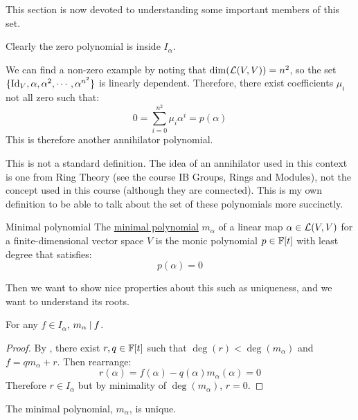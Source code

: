 \documentclass[../Main.tex]{subfiles}
\begin{document}
This section is now devoted to understanding some important members of this set.
\begin{example}
    Clearly the zero polynomial is inside $I_\alpha$.

    We can find a non-zero example by noting that $\dim(\mathcal{L}(V, V)) = n^2$, so the set $\{\operatorname{Id}_V, \alpha, \alpha^2, \cdots, \alpha^{n^2}\}$ is linearly dependent. Therefore, there exist coefficients $\mu_i$ not all zero such that:
    \begin{equation*}
        0 = \sum_{i=0}^{n^2} \mu_i \alpha^i = p(\alpha)
    \end{equation*}
    This is therefore another annihilator polynomial.
\end{example}
\begin{warning}
    This is not a standard definition. The idea of an annihilator used in this context is one from Ring Theory (see the course IB Groups, Rings and Modules), not the concept used in this course (although they are connected). This is my own definition to be able to talk about the set of these polynomials more succinctly.
\end{warning}
\begin{definition}{Minimal polynomial}
    The \underline{minimal polynomial} $m_\alpha$ of a linear map $\alpha \in \mathcal{L}(V, V)$ for a finite-dimensional vector space $V$ is the monic polynomial $p \in \mathbb{F}[t]$ with least degree that satisfies:
    \begin{equation*}
        p(\alpha) = 0
    \end{equation*}
\end{definition}
Then we want to show nice properties about this such as uniqueness, and we want to understand its roots.
\begin{lemma}
    For any $f \in I_\alpha$, $m_\alpha~\vline~f$.
    \label{lemMinPolyDivides}
\end{lemma}
\begin{proof}
    By , there exist $r, q \in \mathbb{F}[t]$ such that $\deg(r) < \deg(m_\alpha)$ and $f = q m_\alpha + r$. Then rearrange:
    \begin{equation*}
        r(\alpha) = f(\alpha) - q(\alpha) m_\alpha(\alpha) = 0
    \end{equation*}
    Therefore $r \in I_\alpha$ but by minimality of $\deg(m_\alpha)$, $r = 0$.
\end{proof}
\begin{theorem}
    The minimal polynomial, $m_\alpha$, is unique.
    \label{thmMinimalPolynomialUnique}
\end{theorem}
\end{document}

